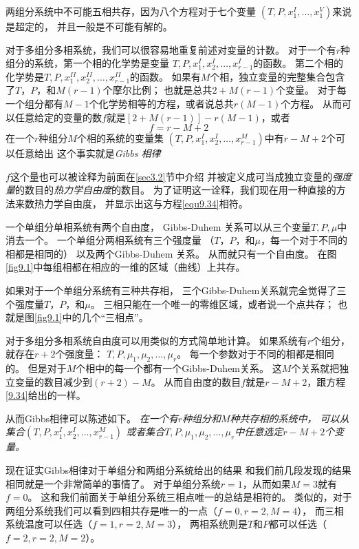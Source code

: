 两组分系统中不可能五相共存，因为八个方程对于七个变量
$(T,P,x_1^I,\ldots,x_1^V)$来说是超定的，
并且一般是不可能有解的。

对于多组分多相系统，我们可以很容易地重复前述对变量的计数。
对于一个有$r$种组分的系统，第一个相的化学势是变量
$T,P,x_1^I,x_2^I,\ldots,x_{r-1}^I$的函数。
第二个相的化学势是$T,P,x_1^{II},x_2^{II},\ldots,x_{r-1}^{II}$的函数。
如果有$M$个相，独立变量的完整集合包含了$T$，$P$，和$M(r-1)$个摩尔比例；
也就是总共$2+M(r-1)$个变量。
对于每一个组分都有$M-1$个化学势相等的方程，或者说总共$r(M-1)$个方程。
从而可以任意给定的变量的数$f$就是$[2+M(r-1)]-r(M-1)$，或者
\begin{equation}
\label{equ9.34}
f=r-M+2
\end{equation}
在一个$r$种组分$M$个相的系统的变量集
$(T,P,x_1^I,x_2^I,\ldots,x_{r-1}^M)$中有$r-M+2$个可以任意给出
这个事实就是{\it Gibbs 相律}

$f$这个量也可以被诠释为前面在\ref{sec3.2}节中介绍
并被定义成可当成独立变量的{\it 强度量}的数目的{\it 热力学自由度}的数目。
为了证明这一诠释，我们现在用一种直接的方法来数热力学自由度，
并显示出这与方程\eqref{equ9.34}相符。

一个单组分单相系统有两个自由度，
Gibbs-Duhem 关系可以从三个变量$T,P,\mu$中消去一个。
一个单组分两相系统有三个强度量
（$T$，$P$，和$\mu$，每一个对于不同的相都是相同的）
以及两个Gibbs-Duhem 关系。
从而就只有一个自由度。
在图\ref{fig9.1}中每组相都在相应的一维的区域（曲线）上共存。

如果对于一个单组分系统有三种共存相，
三个Gibbs-Duhem关系就完全觉得了三个强度量$T$，$P$，和$\mu$。
三相只能在一个唯一的零维区域，或者说一个点共存；
也就是图\ref{fig9.1}中的几个“三相点”。

对于多组分多相系统自由度可以用类似的方式简单地计算。
如果系统有$r$个组分，就存在$r+2$个强度量：
$T,P,\mu_1,\mu_2,\ldots,\mu_r$。
每一个参数对于不同的相都是相同的。
但是对于$M$个相中的每一个都有一个Gibbs-Duhem关系。
这$M$个关系就把独立变量的数目减少到$(r+2)-M$。
从而自由度的数目$f$就是$r-M+2$，跟方程\eqref{9.34}给出的一样。

从而Gibbs相律可以陈述如下。
{\it 在一个有$r$种组分和$M$种共存相的系统中，
可以从集合$(T,P,x_1^I,x_2^I,\ldots,x_{r-1}^M)$
或者集合$T,P,\mu_1,\mu_2,\ldots,\mu_r$中任意选定$r-M+2$个变量。}

现在证实Gibbs相律对于单组分和两组分系统给出的结果
和我们前几段发现的结果相同就是一个非常简单的事情了。
对于单组分系统$r=1$，从而如果$M=3$就有$f=0$。
这和我们前面关于单组分系统三相点唯一的总结是相符的。
类似的，对于两组分系统我们可以看到四相共存是唯一的一点（$f=0,r=2,M=4$），
而三相系统温度可以任选（$f=1,r=2,M=3$），
两相系统则是$T$和$P$都可以任选（$f=2,r=2,M=2$）。

